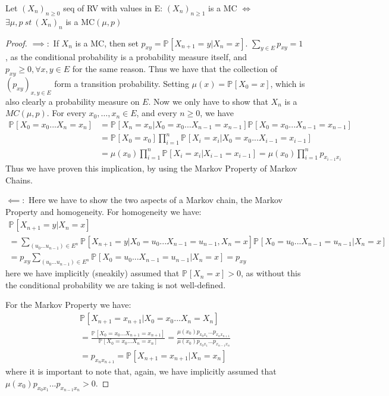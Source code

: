 \begin{prop}
	Let $(X_n)_{n \geq 0}$ seq of RV with values in E:
	$(X_n)_{n \geq 1}$ is a MC $\iff$ $\exists \mu, p\ st\ (X_n)_n$ is a MC$(\mu, p)$
\end{prop}
\begin{proof}
	$\implies:$ If $X_n$ is a MC, then set $p_{xy}=\mathbb{P}_{} \left[ X_{n+1}=y | X_{n}=x \right] $. $\sum_{y \in E}^{} p_{xy}=1$, as the conditional probability is a probability measure itself, and $p_{xy}\geq 0, \forall x, y \in E$ for the same reason. Thus we have that the collection of $(p_{xy})_{x,y \in E}$ form a transition probability. Setting $\mu(x) = \mathbb{P}_{} \left[ X_0 =x \right] $, which is also clearly a probability measure on $E$. Now we only have to show that $X_{n} $ is a $MC(\mu, p)$. For every $x_0,\ldots , x_n \in E$, and every $n\geq 0$, we have
\begin{align}
	\mathbb{P}_{} \left[ X_0=x_0...X_n=x_n \right]  
	&= \mathbb{P}_{} \left[ X_n = x_n | X_0=x_0 ... X_{n-1}=x_{n-1} \right] \mathbb{P}_{} \left[ X_0=x_0 ... X_{n-1}=x_{n-1} \right] \\
	&= \mathbb{P}_{} \left[ X_0 = x_0 \right] \prod_{i=1}^{n} \mathbb{P}_{} \left[ X_i = x_i | X_0=x_0... X_{i-1}=x_{i-1} \right] \\
	&= \mu(x_0) \prod_{i=1}^n \mathbb{P}_{} \left[ X_i = x_i | X_{i-1} = x_{i-1}  \right] = \mu(x_0) \prod_{i=1}^n p_{x_{i-1}x_{i}} 
\end{align}
Thus we have proven this implication, by using the Markov Property of Markov Chains.

$\impliedby:$ Here we have to show the two aspects of a Markov chain, the Markov Property and homogeneity. For homogeneity we have:
\begin{gather}
	\mathbb{P}_{} \left[ X_{n+1} = y | X_n =x \right] \\
	= \sum_{(u_0...u_{n-1}) \in E^n}^{} \mathbb{P}_{} \left[ X_{n+1}=y | X_0=u_0...X_{n-1}=u_{n-1}, X_n =x \right] \mathbb{P}_{} \left[ X_0=u_0... X_{n-1}=u_{n-1} | X_n = x \right] \\
	= p_{xy} \sum_{(u_0...u_{n-1})\in E^n}^{} \mathbb{P}_{} \left[ X_0=u_0...X_{n-1}=u_{n-1} | X_n = x \right] = p_{xy}
\end{gather}
here we have implicitly (sneakily) assumed that $\mathbb{P}_{} \left[ X_n = x \right] > 0$, as without this the conditional probability we are taking is not well-defined.

For the Markov Property we have:
\begin{align}
	\mathbb{P}_{} \left[ X_{n+1}=x_{n+1} | X_0=x_0...X_n=X_n \right] \\
	=\frac{\mathbb{P}_{} \left[ X_0=x_0... X_{n+1}=x_{n+1} \right] } {\mathbb{P}_{} \left[ X_0=x_0 ... X_{n}=x_{n} \right]} = \frac{\mu(x_0)p_{x_0x_1} ... p_{x_{n}x_{n+1}}} {\mu(x_0)p_{x_0x_1}...p_{x_{n-1}x_{n}}} \\
	= p_{x_nx_{n+1}} = \mathbb{P}_{} \left[ X_{n+1} = x_{n+1} | X_n=x_n \right] 
\end{align}
where it is important to note that, again,  we have implicitly assumed that \newline $\mu(x_0)p_{x_0x_1}...p_{x_{n-1}x_n}>0$. 

\end{proof}


